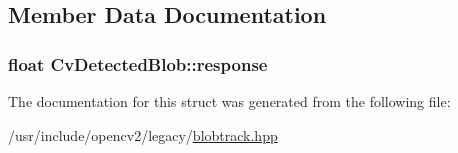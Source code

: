 \subsection{Member Data Documentation}
\hypertarget{structCvDetectedBlob_a0746004f078d8430527bdcb414856e38}{
\subsubsection[{response}]{\setlength{\rightskip}{0pt plus 5cm}float Cv\-Detected\-Blob\-::response}}\label{structCvDetectedBlob_a0746004f078d8430527bdcb414856e38}


The documentation for this struct was generated from the following file\-:\begin{DoxyCompactItemize}
\item 
/usr/include/opencv2/legacy/\hyperlink{blobtrack_8hpp}{blobtrack.\-hpp}\end{DoxyCompactItemize}
